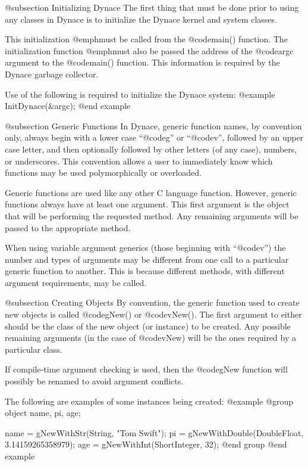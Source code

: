 @subsection Initializing Dynace
The first thing that must be done prior to using any classes in Dynace is
to initialize the Dynace kernel and system classes.

This initialization @emph{must} be called from the @code{main()}
function.  The initialization function @emph{must} also be passed the
address of the @code{argc} argument to the @code{main()} function.  This
information is required by the Dynace garbage collector.

Use of the following is required to initialize the Dynace system:
@example
        InitDynace(&argc);
@end example


@subsection Generic Functions
In Dynace, generic function names, by convention only, always begin with
a lower case ``@code{g}'' or ``@code{v}'', followed by an upper case
letter, and then optionally followed by other letters (of any case),
numbers, or underscores.  This convention allows a user to immediately
know which functions may be used polymorphically or overloaded.

Generic functions are used like any other C language function.  However,
generic functions always have at least one argument.  This first argument
is the object that will be performing the requested method.  Any remaining
arguments will be passed to the appropriate method.

When using variable argument generics (those beginning with
``@code{v}'') the number and types of arguments may be different from
one call to a particular generic function to another.  This is
because different methods, with different argument requirements, may be
called.

@subsection Creating Objects
By convention, the generic function used to create new objects is called
@code{gNew()} or @code{vNew()}.  The first argument to either should be
the class of the new object (or instance) to be created.  Any possible
remaining arguments (in the case of @code{vNew}) will be the ones
required by a particular class.

If compile-time argument checking is used, then the @code{gNew} function
will possibly be renamed to avoid argument conflicts.

The following are examples of some instances being created:
@example
@group
        object   name, pi, age;

        name = gNewWithStr(String, "Tom Swift");
        pi   = gNewWithDouble(DoubleFloat, 3.14159265358979);
        age  = gNewWithInt(ShortInteger, 32);
@end group
@end example

